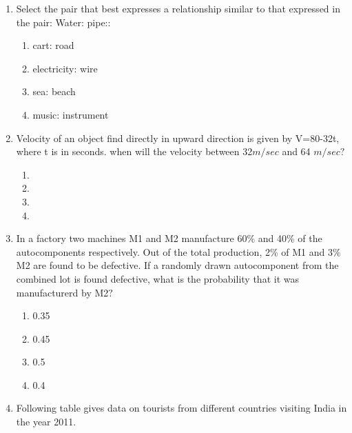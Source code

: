 \documentclass[journal]{IEEEtran}
\begin{document}
\begin{enumerate}[start=1]
\hspace{4cm} IV\\
Which of the above underlined parts of the sentence is not appropriate $?$
\begin{multicols}{4}
    \begin{enumerate}
        \item I
        \item II
        \item III
        \item IV
    \end{enumerate}
\end{multicols}
\item Select the pair that best expresses a relationship similar to that expressed in the pair:  Water: pipe::
\begin{multicols}{2}
    \begin{enumerate}
        \item cart: road
        \item electricity: wire
        \item sea: beach
        \item music: instrument
    \end{enumerate}
\end{multicols}
\item  Velocity of an object find directly in upward direction is given by V=80-32t, where t  is in seconds. when will the velocity between 32$m/sec$ and 64 $m/sec ?$
\begin{multicols}{2}
    \begin{enumerate}
        \item {}
        \item {}
        \item {}
        \item {}
    \end{enumerate}
\end{multicols}
\item In a factory two machines M1 and M2 manufacture 60\% and 40\% of the autocomponents respectively. Out of the total production, 2\% of M1 and 3\% M2  are found to be defective. If a randomly drawn autocomponent from the combined lot is found defective, what is the probability that it was manufacturerd  by M2$?$
\begin{multicols}{4}
    \begin{enumerate}
        \item 0.35
        \item 0.45
        \item 0.5
        \item 0.4
    \end{enumerate}
\end{multicols}
\item Following table gives data on tourists from different countries visiting India in the year 2011.\\
	

\end{enumerate}
\end{document}
